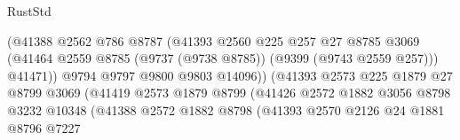 \begin{lexlean}{RustStd}
\begin{coremodule}
                                          (@41388
                                            @2562
                                            @786
                                            @8787
                                            (@41393
                                              @2560
                                              @225
                                              @257
                                              @27
                                              @8785
                                              @3069
                                              (@41464
                                                @2559
                                                @8785
                                                (@9737 (@9738 @8785))
                                                (@9399 (@9743 @2559 @257)))
                                              @41471))
                                          @9794
                                          @9797
                                          @9800
                                          @9803
                                          @14096))
                                      (@41393
                                        @2573
                                        @225
                                        @1879
                                        @27
                                        @8799
                                        @3069
                                        (@41419
                                          @2573
                                          @1879
                                          @8799
                                          (@41426
                                            @2572
                                            @1882
                                            @3056
                                            @8798
                                            @3232
                                            @10348
                                            (@41388
                                              @2572
                                              @1882
                                              @8798
                                              (@41393
                                                @2570
                                                @2126
                                                @24
                                                @1881
                                                @8796
                                                @7227

\end{coremodule}
\end{lexlean}
